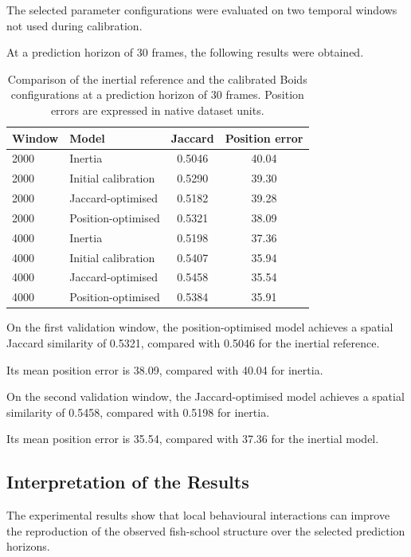 \documentclass[10pt,a4paper]{article}
\begin{document}
The selected parameter configurations
were evaluated on two temporal windows
not used during calibration.

At a prediction horizon of
30 frames, the following results
were obtained.

\begin{table}[htbp]
\centering
\small
\begin{tabular}{llcc}
\toprule
\textbf{Window}
& \textbf{Model}
& \textbf{Jaccard}
& \textbf{Position error}\\
\midrule
2000
& Inertia
& 0.5046 & 40.04\\
2000
& Initial calibration
& 0.5290 & 39.30\\
2000
& Jaccard-optimised
& 0.5182 & 39.28\\
2000
& Position-optimised
& 0.5321 & 38.09\\
\midrule
4000
& Inertia
& 0.5198 & 37.36\\
4000
& Initial calibration
& 0.5407 & 35.94\\
4000
& Jaccard-optimised
& 0.5458 & 35.54\\
4000
& Position-optimised
& 0.5384 & 35.91\\
\bottomrule
\end{tabular}
\caption{
Comparison of the inertial reference
and the calibrated Boids configurations
at a prediction horizon of 30 frames.
Position errors are expressed in
native dataset units.
}
\label{tab:app-boids-validation}
\end{table}

On the first validation window,
the position-optimised model
achieves a spatial Jaccard
similarity of 0.5321,
compared with 0.5046
for the inertial reference.

Its mean position error
is 38.09, compared with
40.04 for inertia.

On the second validation window,
the Jaccard-optimised model
achieves a spatial similarity
of 0.5458, compared with
0.5198 for inertia.

Its mean position error
is 35.54, compared with
37.36 for the inertial model.

\subsection{Interpretation of the Results}

The experimental results show
that local behavioural interactions
can improve the reproduction
of the observed fish-school structure
over the selected prediction horizons.
\end{document}

